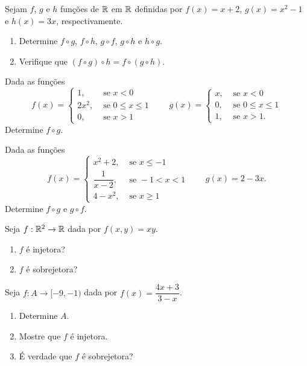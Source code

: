 \documentclass[12pt]{exam}
\begin{document}
\vspace{.3cm}

\questao{} Sejam $f$, $g$ e $h$ fun\c{c}\~oes de $\mathbb{R}$ em $\mathbb{R}$ definidas por $f(x) = x + 2$, $g(x) = x^2 - 1$ e $h(x) = 3x$, respectivamente.
\begin{enumerate}[label={\alph*})]
    \item Determine $f \circ g$, $f \circ h$, $g \circ f$, $g \circ h$ e $h \circ g$.
    \item Verifique que $(f \circ g)\circ h = f \circ (g \circ h)$.
\end{enumerate}

\vspace{.3cm}

\questao{} Dada as fun\c{c}\~oes
\[
    f(x) = \begin{cases}
        1, & \mbox{ se } x < 0\\
        2x^2, & \mbox{ se } 0 \le x \le 1\\
        0, & \mbox{ se } x > 1
    \end{cases} \qquad g(x) = \begin{cases}
        x, & \mbox{ se } x < 0\\
        0, & \mbox{ se } 0 \le x \le 1\\
        1, & \mbox{ se } x > 1.
    \end{cases}
\]
Determine $f\circ g$.

\vspace{.3cm}

\questao{} Dada as fun\c{c}\~oes
\[
    f(x) = \begin{cases}
        x^2 + 2, & \mbox{ se } x \le -1\\
        \dfrac{1}{x - 2}, & \mbox{ se } -1 < x < 1\\
        4 - x^2, & \mbox{ se } x \ge 1
    \end{cases} \qquad g(x) = 2 - 3x.
\]
Determine $f\circ g$ e $g \circ f$.

\newpage

\questao{} Seja $f: \mathbb{R}^2 \to \mathbb{R}$ dada por $f(x,y) = xy$.
\begin{enumerate}[label={\alph*})]
    \item $f$ {\'e} injetora?
    \item $f$ {\'e} sobrejetora?
\end{enumerate}

\vspace{.3cm}

\questao{} Seja $f : A \to [-9,-1)$ dada por $f(x) = \dfrac{4x + 3}{3 - x}$.
\begin{enumerate}[label={\alph*})]
    \item Determine $A$.
    \item Mostre que $f$ \'e injetora.
    \item \'E verdade que $f$ \'e sobrejetora?
\end{enumerate}
\end{document}
